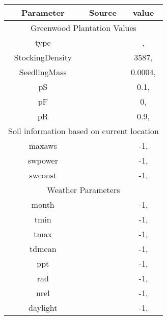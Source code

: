 \begin{tabular}{|c|c|c|}
\hline
Parameter & Source & value\\
\hline
\multicolumn{3}{|c|}{Greenwood Plantation Values}\\
type &  & ,\\
StockingDensity &  & 3587,\\
SeedlingMass &  & 0.0004,\\
pS &  & 0.1,\\
pF &  & 0,\\
pR &  & 0.9,\\
\hline
\multicolumn{3}{|c|}{Soil information based on current location}\\
maxaws &  & -1,\\
swpower &  & -1,\\
swconst &  & -1,\\
\hline
\multicolumn{3}{|c|}{ Weather Parameters}\\
month &  & -1,\\
tmin &  & -1,\\
tmax &  & -1,\\
tdmean &  & -1,\\
ppt &  & -1,\\
rad &  & -1,\\
nrel &  & -1,\\
daylight &  & -1,\\
\hline
\end{tabular}
